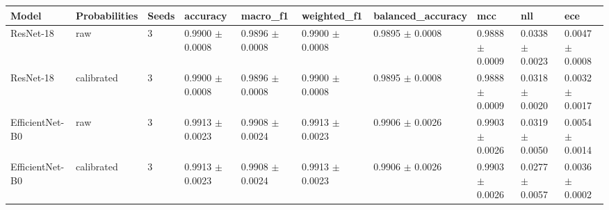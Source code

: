 \begin{tabular}{llllllllll}
\hline
Model & Probabilities & Seeds & accuracy & macro_f1 & weighted_f1 & balanced_accuracy & mcc & nll & ece \\
\hline
ResNet-18 & raw & 3 & 0.9900 $\pm$ 0.0008 & 0.9896 $\pm$ 0.0008 & 0.9900 $\pm$ 0.0008 & 0.9895 $\pm$ 0.0008 & 0.9888 $\pm$ 0.0009 & 0.0338 $\pm$ 0.0023 & 0.0047 $\pm$ 0.0008 \\
ResNet-18 & calibrated & 3 & 0.9900 $\pm$ 0.0008 & 0.9896 $\pm$ 0.0008 & 0.9900 $\pm$ 0.0008 & 0.9895 $\pm$ 0.0008 & 0.9888 $\pm$ 0.0009 & 0.0318 $\pm$ 0.0020 & 0.0032 $\pm$ 0.0017 \\
EfficientNet-B0 & raw & 3 & 0.9913 $\pm$ 0.0023 & 0.9908 $\pm$ 0.0024 & 0.9913 $\pm$ 0.0023 & 0.9906 $\pm$ 0.0026 & 0.9903 $\pm$ 0.0026 & 0.0319 $\pm$ 0.0050 & 0.0054 $\pm$ 0.0014 \\
EfficientNet-B0 & calibrated & 3 & 0.9913 $\pm$ 0.0023 & 0.9908 $\pm$ 0.0024 & 0.9913 $\pm$ 0.0023 & 0.9906 $\pm$ 0.0026 & 0.9903 $\pm$ 0.0026 & 0.0277 $\pm$ 0.0057 & 0.0036 $\pm$ 0.0002 \\
\hline
\end{tabular}